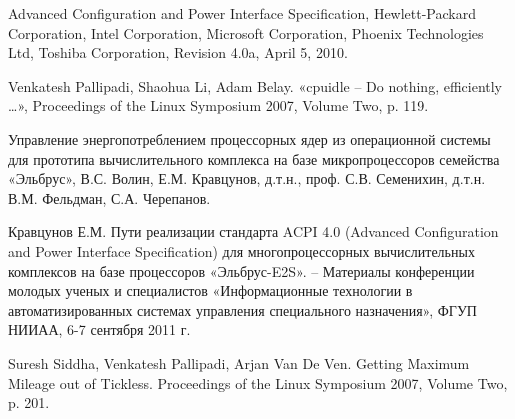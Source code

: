 \documentclass{article}
\begin{document}
\begin{thebibliography}{9} 

 Advanced Configuration and Power Interface Specification, Hewlett-Packard Corporation, Intel Corporation, Microsoft Corporation, Phoenix Technologies Ltd, Toshiba Corporation, Revision 4.0a, April 5, 2010.

 Venkatesh Pallipadi, Shaohua Li, Adam Belay. «cpuidle – Do nothing, efficiently …», Proceedings of the Linux Symposium 2007, Volume Two, p. 119.

 Управление энергопотреблением процессорных ядер из операционной системы для прототипа вычислительного комплекса на базе микропроцессоров семейства «Эльбрус», В.С. Волин, Е.М. Кравцунов, д.т.н., проф. С.В. Семенихин, д.т.н. В.М. Фельдман, С.А. Черепанов.

 Кравцунов Е.М. Пути реализации стандарта ACPI 4.0 (Advanced Configuration and
Power Interface Specification) для многопроцессорных вычислительных комплексов на базе
процессоров «Эльбрус-E2S». – Материалы конференции молодых ученых и специалистов
«Информационные технологии в автоматизированных системах управления специального
назначения», ФГУП НИИАА, 6-7 сентября 2011 г.

 Suresh Siddha, Venkatesh Pallipadi, Arjan Van De Ven. Getting Maximum Mileage out
of Tickless. Proceedings of the Linux Symposium 2007, Volume Two, p. 201.

\end{thebibliography}
\end{document}
